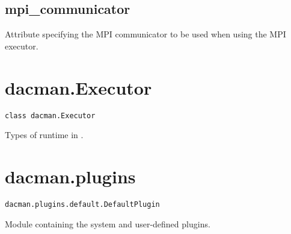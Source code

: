 \subsection{mpi\_communicator}

Attribute specifying the MPI communicator to be used when using
the MPI executor.

\section{dacman.Executor}
\texttt{class dacman.Executor}

Types of runtime in \systemname.


\section{dacman.plugins} 
\texttt{dacman.plugins.default.DefaultPlugin}

Module containing the system and user-defined plugins.
